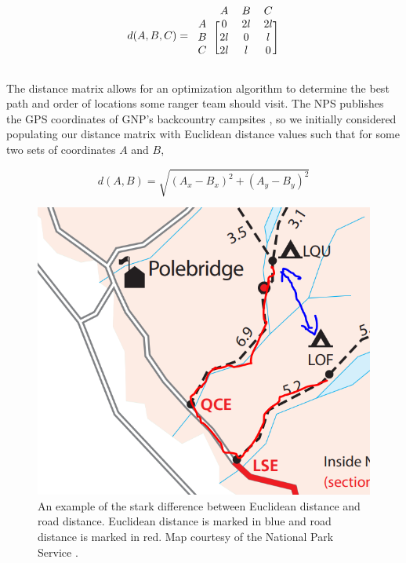 \documentclass[12pt]{article}
\begin{document}
\begin{equation}
  d(A,B,C)=\begin{blockarray}{cccc}
     & A & B & C \\
    \begin{block}{c[ccc]}
      A & 0 & 2l & 2l \\
      B & 2l & 0 & l \\
      C & 2l & l & 0  \\
    \end{block}
  \end{blockarray}
\end{equation}

The distance matrix allows for an optimization algorithm to determine the best path and order of locations some ranger team should visit. The NPS publishes the GPS coordinates of GNP's backcountry campsites \cite{campgroundCoordinates}, so we initially considered populating our distance matrix with Euclidean distance values such that for some two sets of coordinates $A$ and $B$,

\begin{equation}
    d(A,B) = \sqrt{(A_x-B_x)^2+(A_y-B_y)^2}
\end{equation}

\begin{figure}
    \centering
    \includegraphics{"Euclidean Inadequacy"}
    \caption{An example of the stark difference between Euclidean distance and road distance. Euclidean distance is marked in blue and road distance is marked in red. Map courtesy of the National Park Service \cite{npsMap}.}
    \label{fig:euclideanInadequacy}
\end{figure}
\end{document}
